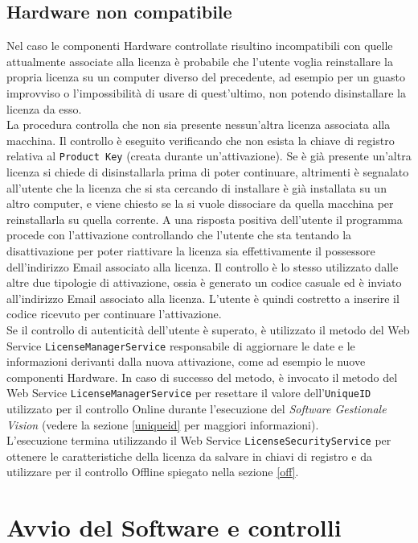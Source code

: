 \subsection{Hardware non compatibile}
\label{hnc}
Nel caso le componenti Hardware controllate risultino incompatibili con quelle attualmente associate alla licenza è probabile che l'utente voglia reinstallare la propria licenza su un computer diverso del precedente, ad esempio per un guasto improvviso o l'impossibilità di usare di quest'ultimo, non potendo disinstallare la licenza da esso. 
\\La procedura controlla che non sia presente nessun’altra licenza associata alla macchina. Il controllo è eseguito verificando che non esista la chiave di registro relativa al \texttt{Product Key} (creata durante un'attivazione). Se è già presente un’altra licenza si chiede di disinstallarla prima di poter continuare, altrimenti è segnalato all’utente che la licenza che si sta cercando di installare è già installata su un altro computer, e viene chiesto se la si vuole dissociare da quella macchina per reinstallarla su quella corrente. A una risposta positiva dell’utente il programma procede con l’attivazione controllando che l’utente che sta tentando la disattivazione per poter riattivare la licenza sia effettivamente il possessore dell'indirizzo Email associato alla licenza. Il controllo è lo stesso utilizzato dalle altre due tipologie di attivazione, ossia è generato un codice casuale ed è inviato all'indirizzo Email associato alla licenza. L'utente è quindi costretto a inserire il codice ricevuto per continuare l'attivazione.
\\
Se il controllo di autenticità dell'utente è superato, è utilizzato il metodo del Web Service \texttt{LicenseManagerService} responsabile di aggiornare le date e le informazioni derivanti dalla nuova attivazione, come ad esempio le nuove componenti Hardware. In caso di successo del metodo, è invocato il metodo del Web Service \texttt{LicenseManagerService} per resettare il valore dell’\texttt{UniqueID} utilizzato per il controllo Online durante l’esecuzione del \textit{Software Gestionale Vision} (vedere la sezione \ref{uniqueid} per maggiori informazioni).\\
L’esecuzione termina utilizzando il Web Service \texttt{LicenseSecurityService} per ottenere le caratteristiche della licenza da salvare in chiavi di registro e da utilizzare per il controllo Offline spiegato nella sezione \ref{off}. 


\section{Avvio del Software e controlli}

